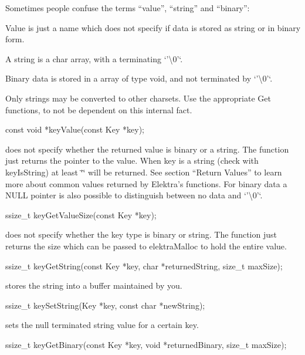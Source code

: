 Sometimes people confuse the terms “value”, “string” and “binary”\+:


\begin{DoxyItemize}
\item Value is just a name which does not specify if data is stored as string or in binary form.
\item A string is a char array, with a terminating `'\textbackslash{}0'`.
\item Binary data is stored in a array of type void, and not terminated by `'\textbackslash{}0'`.
\end{DoxyItemize}

Only strings may be converted to other charsets. Use the appropriate Get functions, to not be dependent on this internal fact. \begin{DoxyVerb}    const void *keyValue(const Key *key);
\end{DoxyVerb}


does not specify whether the returned value is binary or a string. The function just returns the pointer to the value. When {\ttfamily key} is a string (check with {\ttfamily key\+Is\+String}) at least {\ttfamily \char`\"{}\char`\"{}} will be returned. See section “\+Return Values” to learn more about common values returned by Elektra's functions. For binary data a {\ttfamily N\+U\+L\+L} pointer is also possible to distinguish between no data and `'\textbackslash{}0'`. \begin{DoxyVerb}    ssize_t keyGetValueSize(const Key *key);
\end{DoxyVerb}


does not specify whether the key type is binary or string. The function just returns the size which can be passed to {\ttfamily elektra\+Malloc} to hold the entire value. \begin{DoxyVerb}    ssize_t keyGetString(const Key *key, char *returnedString, size_t maxSize);
\end{DoxyVerb}


stores the string into a buffer maintained by you. \begin{DoxyVerb}    ssize_t keySetString(Key *key, const char *newString);
\end{DoxyVerb}


sets the null terminated string value for a certain key. \begin{DoxyVerb}    ssize_t keyGetBinary(const Key *key, void *returnedBinary, size_t maxSize);
\end{DoxyVerb}


